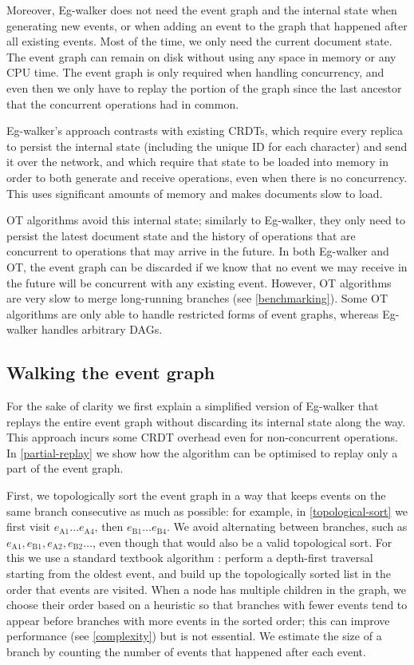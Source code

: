 \documentclass[sigplan,10pt]{acmart}
\newcommand{\algname}{Eg-walker\xspace}
\begin{document}
Moreover, \algname does not need the event graph and the internal state when generating new events, or when adding an event to the graph that happened after all existing events.
Most of the time, we only need the current document state.
The event graph can remain on disk without using any space in memory or any CPU time.
The event graph is only required when handling concurrency, and even then we only have to replay the portion of the graph since the last ancestor that the concurrent operations had in common.

\algname's approach contrasts with existing CRDTs, which require every replica to persist the internal state (including the unique ID for each character) and send it over the network, and which require that state to be loaded into memory in order to both generate and receive operations, even when there is no concurrency.
This uses significant amounts of memory and makes documents slow to load.

OT algorithms avoid this internal state; similarly to \algname, they only need to persist the latest document state and the history of operations that are concurrent to operations that may arrive in the future.
In both \algname and OT, the event graph can be discarded if we know that no event we may receive in the future will be concurrent with any existing event.
However, OT algorithms are very slow to merge long-running branches (see \autoref{benchmarking}).
Some OT algorithms are only able to handle restricted forms of event graphs, whereas \algname handles arbitrary DAGs.

\subsection{Walking the event graph}\label{graph-walk}

For the sake of clarity we first explain a simplified version of \algname that replays the entire event graph without discarding its internal state along the way. This approach incurs some CRDT overhead even for non-concurrent operations.
In \autoref{partial-replay} we show how the algorithm can be optimised to replay only a part of the event graph.

First, we topologically sort the event graph in a way that keeps events on the same branch consecutive as much as possible: for example, in \autoref{topological-sort} we first visit $e_\mathrm{A1} \dots e_\mathrm{A4}$, then $e_\mathrm{B1} \dots e_\mathrm{B4}$. We avoid alternating between branches, such as $e_\mathrm{A1}, e_\mathrm{B1}, e_\mathrm{A2}, e_\mathrm{B2} \dots$, even though that would also be a valid topological sort.
For this we use a standard textbook algorithm \cite{CLRS2009}: perform a depth-first traversal starting from the oldest event, and build up the topologically sorted list in the order that events are visited.
When a node has multiple children in the graph, we choose their order based on a heuristic so that branches with fewer events tend to appear before branches with more events in the sorted order; this can improve performance (see \autoref{complexity}) but is not essential.
We estimate the size of a branch by counting the number of events that happened after each event.
\end{document}
